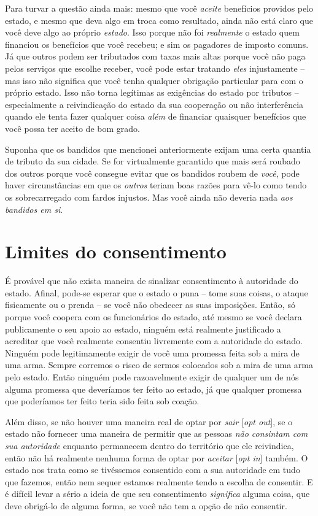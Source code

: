 Para turvar a questão ainda mais: mesmo que você \emph{aceite} benefícios providos pelo estado, e mesmo que deva algo em troca como resultado, ainda não está claro que você deve algo ao próprio \emph{estado}. Isso porque não foi \emph{realmente} o estado quem financiou os benefícios que você recebeu; e sim os pagadores de imposto comuns. Já que outros podem ser tributados com taxas mais altas porque você não paga pelos serviços que escolhe receber, você pode estar tratando \emph{eles} injustamente -- mas isso não significa que você tenha qualquer obrigação particular para com o próprio estado. Isso não torna legítimas as exigências do estado por tributos -- especialmente a reivindicação do estado da sua cooperação ou não interferência quando ele tenta fazer qualquer coisa \emph{além} de financiar quaisquer benefícios que você possa ter aceito de bom grado.

Suponha que os bandidos que mencionei anteriormente exijam uma certa quantia de tributo da sua cidade. Se for virtualmente garantido que mais será roubado dos outros porque você consegue evitar que os bandidos roubem de \emph{você}, pode haver circunstâncias em que os \emph{outros} teriam boas razões para vê-lo como tendo os sobrecarregado com fardos injustos. Mas você ainda não deveria nada \emph{aos bandidos em si}.

\section{Limites do consentimento}

É provável que não exista maneira de sinalizar consentimento à autoridade do estado. Afinal, pode-se esperar que o estado o puna -- tome suas coisas, o ataque fisicamente ou o prenda -- se você não obedecer as suas imposições. Então, só porque você coopera com os funcionários do estado, até mesmo se você declara publicamente o seu apoio ao estado, ninguém está realmente justificado a acreditar que você realmente consentiu livremente com a autoridade do estado. Ninguém pode legitimamente exigir de você uma promessa feita sob a mira de uma arma. Sempre corremos o risco de sermos colocados sob a mira de uma arma pelo estado. Então ninguém pode razoavelmente exigir de qualquer um de nós alguma promessa que deveríamos ter feito ao estado, já que qualquer promessa que poderíamos ter feito teria sido feita sob coação.

Além disso, se não houver uma maneira real de optar por \emph{sair} [\emph{opt out}], se o estado não fornecer uma maneira de permitir que as pessoas \emph{não consintam com sua autoridade} enquanto permanecem dentro do território que ele reivindica, então não há realmente nenhuma forma de optar por \emph{aceitar} [\emph{opt in}] também. O estado nos trata como se tivéssemos consentido com a sua autoridade em tudo que fazemos, então nem sequer estamos realmente tendo a escolha de consentir. E é difícil levar a sério a ideia de que seu consentimento \emph{significa} alguma coisa, que deve obrigá-lo de alguma forma, se você não tem a opção de não consentir.

